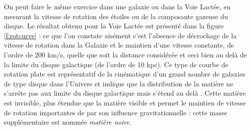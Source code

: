 On peut faire le même exercice dans une galaxie ou dans la Voie Lactée, en mesurant la vitesse de rotation des étoiles ou de la composante gazeuse du disque. Le résultat obtenu pour la Voie Lactée est présenté dans la figure \ref{f:rotcurve} : ce que l'on constate aisément c'est l'absence de décrochage de la vitesse de rotation dans la Galaxie et le maintien d'une vitesse constante, de l'ordre de 200 km/s, quelle que soit la distance considérée et ceci bien au delà de la limite du disque galactique (de l'ordre de 10 kpc). Ce type de courbe de rotation plate est représentatif de la cinématique d'un grand nombre de galaxies de type disque dans l'Univers et indique que la distribution de la matière ne s'arrête pas aux limite du disque galactique mais s'étend au delà . Cette matière est invisible, plus étendue que la matière visible et permet le maintien de vitesse de rotation importantes de par son influence gravitationnelle : cette masse supplémentaire est nommée \textit{matière noire}.

